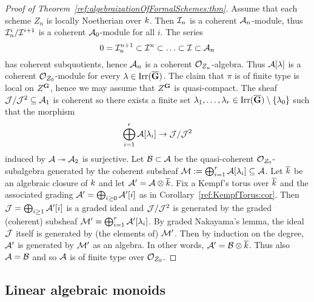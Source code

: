 \begin{proof}[Proof of Theorem~\ref{ref:algebraizationOfFormalSchemes:thm}]
Assume that each scheme $Z_n$ is locally Noetherian over $k$. Then ${\mathcal I}_n$
is a coherent ${\mathcal A}_n$-module, thus ${\mathcal I}_n^i/{\mathcal I}^{i+1}$ is a coherent
${\mathcal A}_0$-module for all $i$. The series
\[
    0 = {\mathcal I}_n^{n+1} \subset {\mathcal I}^n \subset  \ldots \subset {\mathcal I} \subset {\mathcal A}_n
\]
has coherent subquotients, hence ${\mathcal A}_n$ is a coherent ${\mathcal O}_{Z_n}$-algebra.
Thus ${\mathcal A}[\lambda]$ is a coherent ${\mathcal O}_{Z_0}$-module for every
$\lambda\in \operatorname{Irr}(\overline{\mathbf{G}})$. The claim that $\pi$ is of finite type is local on
$Z^{\mathbf{G}}$, hence we may
assume that $Z^{\mathbf{G}}$ is quasi-compact.
The sheaf ${\mathcal J}/{\mathcal J}^2\subseteq {\mathcal A}_1$ is coherent so there exists a finite set
$\lambda_1, \ldots, \lambda_r\in \operatorname{Irr}(\overline{\mathbf{G}})\setminus \{\lambda_0\}$ such that the morphism
\[
    \bigoplus_{i=1}^r{\mathcal A}[\lambda_i]\rightarrow {\mathcal J}/{\mathcal J}^2
\]
induced by ${\mathcal A}\twoheadrightarrow {\mathcal A}_2$ is surjective. Let ${\mathcal B} \subset {\mathcal A}$
be the quasi-coherent ${\mathcal O}_{Z_0}$-subalgebra generated by the coherent
subsheaf ${\mathcal M} := \bigoplus_{i=1}^r{\mathcal A}[\lambda_i]\subseteq {\mathcal A}$.
Let $\overline{k}$ be an algebraic closure of $k$ and let ${\mathcal A}' = {\mathcal A} \otimes
\overline{k}$. Fix a Kempf's torus over
$\overline{k}$ and the associated grading ${\mathcal A}' = \bigoplus_{i\geq 0}
{\mathcal A}'[i]$ as in
Corollary~\ref{ref:KempfTorus:cor}.
Then ${\mathcal J} = \bigoplus_{i\geq 1} {\mathcal A}'[i]$ is a graded ideal and ${\mathcal J}/{\mathcal J}^2$ is
generated by the graded (coherent) subsheaf ${\mathcal M}' = \bigoplus_{i=1}^r{\mathcal A}'[\lambda_i]$. By
graded Nakayama's lemma, the ideal ${\mathcal J}$ itself is generated by (the elements
of) ${\mathcal M}'$. Then by induction on the degree, ${\mathcal A}'$ is generated by ${\mathcal M}'$ as
an algebra. In other words, ${\mathcal A}' = {\mathcal B}\otimes \overline{k}$. Thus also ${\mathcal A} = {\mathcal B}$ and so ${\mathcal A}$ is of
finite type over ${\mathcal O}_{Z_0}$.
\end{proof}

\subsection{Linear algebraic monoids}

